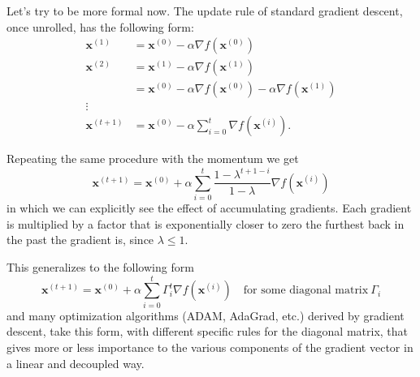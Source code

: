 Let's try to be more formal now. The update rule of standard gradient descent, once unrolled, has the following form:
\begin{equation}
    \begin{aligned}
        \mathbf{x}^{(1)} &= \mathbf{x}^{(0)} - \alpha \nabla f(\mathbf{x}^{(0)})  \\
        \mathbf{x}^{(2)} &= \mathbf{x}^{(1)} - \alpha \nabla f(\mathbf{x}^{(1)})  \\
        &= \mathbf{x}^{(0)}- \alpha \nabla f(\mathbf{x}^{(0)})  - \alpha \nabla f(\mathbf{x}^{(1)})  \\
        \vdots & \\
        \mathbf{x}^{(t+1)} & = \mathbf{x}^{(0)} - \alpha \sum_{i=0}^t \nabla f(\mathbf{x}^{(i)}).
    \end{aligned}
\end{equation}

Repeating the same procedure with the momentum we get
\begin{equation}
    \mathbf{x}^{(t+1)} = \mathbf{x}^{(0)} + \alpha \sum_{i=0}^t \frac{1-\lambda^{t+1-i}}{1-\lambda} \nabla f(\mathbf{x}^{(i)})
\end{equation}
in which we can explicitly see the effect of accumulating gradients. Each gradient is multiplied by a factor that is exponentially closer to zero the furthest back in the past the gradient is, since $\lambda \leq 1$.

This generalizes to the following form
\begin{equation}
    \mathbf{x}^{(t+1)} = \mathbf{x}^{(0)} + \alpha \sum_{i=0}^t \Gamma_i^{t} \nabla f(\mathbf{x}^{(i)}) \quad\textrm{for some diagonal matrix}~\Gamma_i
\end{equation}
and many optimization algorithms (ADAM, AdaGrad, etc.) derived by gradient descent, take this form, with different specific rules for the diagonal matrix, that gives more or less importance to the various components of the gradient vector in a linear and decoupled way.
